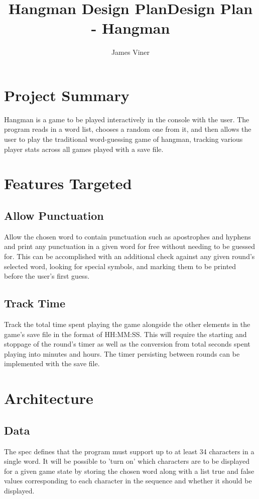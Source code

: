 \documentclass[11pt]{report}
\title{Hangman Design Plan}
\begin{document}
\title{Design Plan - Hangman}
\author{James Viner}
\date{} %

\maketitle

\section*{Project Summary}
Hangman is a game to be played interactively in the console with the user. The program reads in a word list, chooses a random one from it, and then allows the user to play the traditional word-guessing game of hangman, tracking various player stats across all games played with a save file.
\section*{Features Targeted}
\subsection*{Allow Punctuation}
Allow the chosen word to contain punctuation such as apostrophes and hyphens and print any punctuation in a given word for free without needing to be guessed for. This can be accomplished with an additional check against any given round's selected word, looking for special symbols, and marking them to be printed before the user's first guess.
\subsection*{Track Time}
Track the total time spent playing the game alongside the other elements in the game's save file in the format of HH:MM:SS. This will require the starting and stoppage of the round's timer as well as the conversion from total seconds spent playing into minutes and hours. The timer persisting between rounds can be implemented with the save file.
\section*{Architecture}
\subsection*{Data}
The spec defines that the program must support up to at least 34 characters in a single word. It will be possible to 'turn on' which characters are to be displayed for a given game state by storing the chosen word along with a list true and false values corresponding to each character in the sequence and whether it should be displayed.\\
\end{document}
